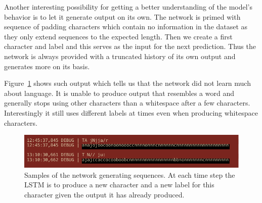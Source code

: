 Another interesting possibility for getting a better understanding of the model's behavior is to let it generate output on its own. The network is primed with sequence of padding characters which contain no information in the dataset as they only extend sequences to the expected length. Then we create a first character and label and this serves as the input for the next prediction. Thus the network is always provided with a truncated history of its own output and generates more on its basis.

Figure~\ref{fig:LSTM multi generating output} shows such output which tells us that the network did not learn much about language. It is unable to produce output that resembles a word and generally stops using other characters than a whitespace after a few characters. Interestingly it still uses different labels at times even when producing whitespace characters.

\begin{figure}[h]
    \centering
    \includegraphics[width=\textwidth]{img/LSTM-generating-output.pdf}
    \caption{Samples of the network generating sequences. At each time step the LSTM is to produce a new character and a new label for this character given the output it has already produced.}
\label{fig:LSTM multi generating output}
\end{figure}
